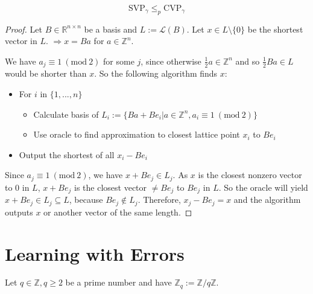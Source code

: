 \documentclass{report}
\newcommand{\Z}{\mathbb{Z}}
\newcommand{\R}{\mathbb{R}}
\begin{document}
\example
\begin{equation}
\mathrm{SVP}_\gamma \leq_p \mathrm{CVP}_\gamma
\end{equation}

\begin{proof}
Let $B \in \R^{n \times n}$ be a basis and $L := \mathcal{L}(B)$. Let $x \in L \setminus \{0\}$ be the shortest vector in $L$. 
$\Rightarrow{} x = Ba$ for $a \in \Z^n$. 

We have $a_j \equiv 1 \ (\text{mod} \ 2)$ for some $j$, since otherwise $\frac 1 2 a \in \Z^n$ and so $\frac 1 2 B a \in L$ would be shorter than $x$. So the following algorithm finds $x$:
\begin{itemize}
\item For $i$ in $\{1, ..., n\}$
\begin{itemize}
\item Calculate basis of $L_i := \{ Ba + Be_i | a \in \Z^n, a_i \equiv 1 \ (\text{mod} \ 2) \}$
\item Use oracle to find approximation to closest lattice point $x_i$ to $Be_i$
\end{itemize}
\item Output the shortest of all $x_i - Be_i$
\end{itemize}
Since $a_j \equiv 1 \ (\text{mod} \ 2)$, we have $x + Be_j \in L_j$. As $x$ is the closest nonzero vector to $0$ in $L$, $x + Be_j$ is the closest vector $\neq Be_j$ to $Be_j$ in $L$. So the oracle will yield $x + Be_j \in L_j \subseteq L$, because $Be_j \not \in L_j$. Therefore, $x_j - Be_j = x$ and the algorithm outputs $x$ or another vector of the same length. \qedhere
\end{proof}


\chapter{Learning with Errors}

Let $q \in \Z, q \geq 2$ be a prime number and have $\Z_q := \Z / q\Z$.
\end{document}
